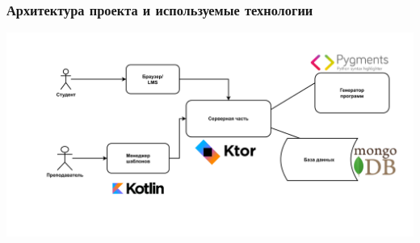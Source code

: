 \documentclass[14pt,aspectratio=169,hyperref={pdftex,unicode},xcolor=dvipsnames]{beamer}
\begin{document}



\begin{frame}
    \frametitle{Архитектура проекта и используемые технологии}
    \begin{center}
        \includegraphics[width=\textwidth]{images/architecture-simple.pdf}
    \end{center}
\end{frame}
\end{document}
